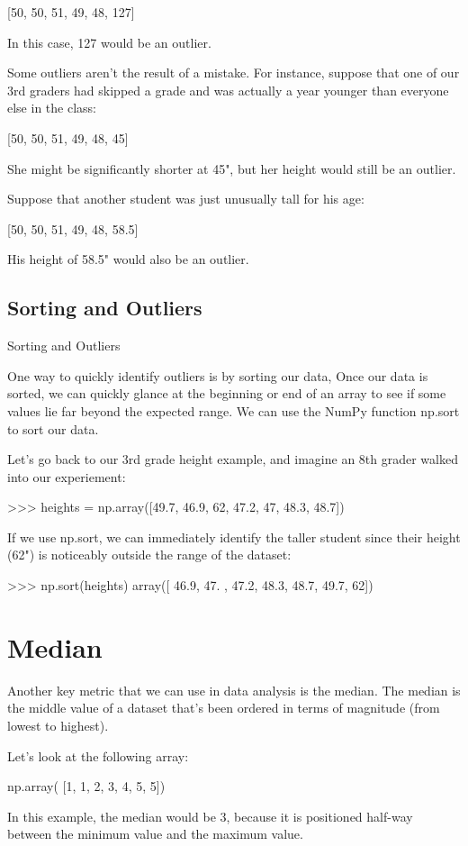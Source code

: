 \documentclass{journal}
\begin{document}
[50, 50, 51, 49, 48, 127]

In this case, 127 would be an outlier.

Some outliers aren’t the result of a mistake. For instance, suppose that one of our 3rd graders had skipped a grade and was actually a year younger than everyone else in the class:

[50, 50, 51, 49, 48, 45]

She might be significantly shorter at 45", but her height would still be an outlier.

Suppose that another student was just unusually tall for his age:

[50, 50, 51, 49, 48, 58.5]

His height of 58.5" would also be an outlier.

\subsection{Sorting and Outliers}
Sorting and Outliers

One way to quickly identify outliers is by sorting our data, Once our data is sorted, we can quickly glance at the beginning or end of an array to see if some values lie far beyond the expected range. We can use the NumPy function np.sort to sort our data.

Let’s go back to our 3rd grade height example, and imagine an 8th grader walked into our experiement:

>>> heights = np.array([49.7, 46.9, 62, 47.2, 47, 48.3, 48.7])

If we use np.sort, we can immediately identify the taller student since their height (62") is noticeably outside the range of the dataset:

>>> np.sort(heights)
array([ 46.9,  47. ,  47.2,  48.3,  48.7,  49.7,  62])

\section{Median}
Another key metric that we can use in data analysis is the median. The median is the middle value of a dataset that’s been ordered in terms of magnitude (from lowest to highest).

Let's look at the following array:

np.array( [1, 1, 2, 3, 4, 5, 5])

In this example, the median would be 3, because it is positioned half-way between the minimum value and the maximum value.
\end{document}
